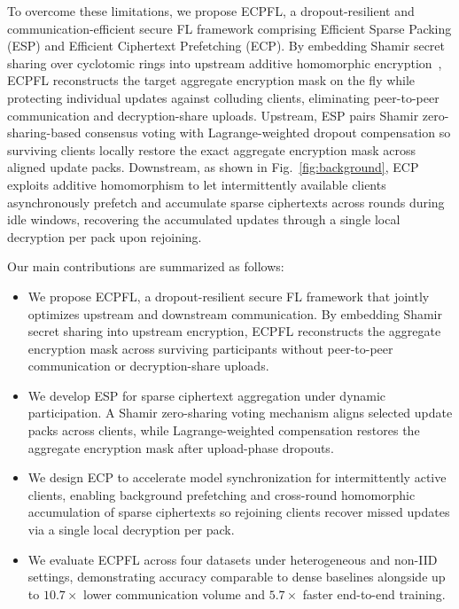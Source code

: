 To overcome these limitations, we propose \textsc{ECPFL}, a dropout-resilient and communication-efficient secure FL framework comprising Efficient Sparse Packing (\textsc{ESP}) and Efficient Ciphertext Prefetching (\textsc{ECP}). By embedding Shamir secret sharing over cyclotomic rings into upstream additive homomorphic encryption~\cite{wu2025esafl}, \textsc{ECPFL} reconstructs the target aggregate encryption mask on the fly while protecting individual updates against colluding clients, eliminating peer-to-peer communication and decryption-share uploads. Upstream, \textsc{ESP} pairs Shamir zero-sharing-based consensus voting with Lagrange-weighted dropout compensation so surviving clients locally restore the exact aggregate encryption mask across aligned update packs. Downstream, as shown in Fig.~\ref{fig:background}, \textsc{ECP} exploits additive homomorphism to let intermittently available clients asynchronously prefetch and accumulate sparse ciphertexts across rounds during idle windows, recovering the accumulated updates through a single local decryption per pack upon rejoining.

Our main contributions are summarized as follows:
\begin{itemize}
    \item We propose \textsc{ECPFL}, a dropout-resilient secure FL framework that jointly optimizes upstream and downstream communication. By embedding Shamir secret sharing into upstream encryption, \textsc{ECPFL} reconstructs the aggregate encryption mask across surviving participants without peer-to-peer communication or decryption-share uploads.
    
    \item We develop \textsc{ESP} for sparse ciphertext aggregation under dynamic participation. A Shamir zero-sharing voting mechanism aligns selected update packs across clients, while Lagrange-weighted compensation restores the aggregate encryption mask after upload-phase dropouts.
    
    \item We design \textsc{ECP} to accelerate model synchronization for intermittently active clients, enabling background prefetching and cross-round homomorphic accumulation of sparse ciphertexts so rejoining clients recover missed updates via a single local decryption per pack.
    
    \item We evaluate \textsc{ECPFL} across four datasets under heterogeneous and non-IID settings, demonstrating accuracy comparable to dense baselines alongside up to $10.7\times$ lower communication volume and $5.7\times$ faster end-to-end training.
\end{itemize}

